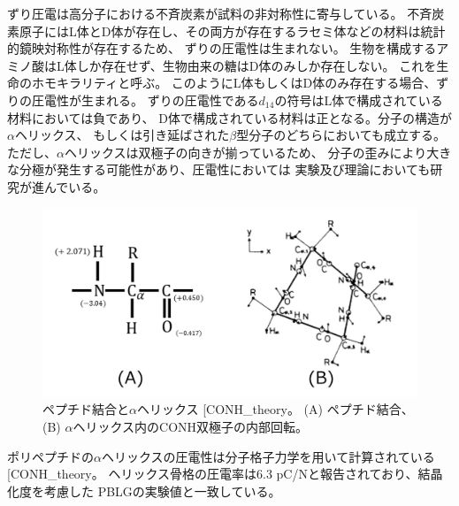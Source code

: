 \documentclass[dvipdfmx,12pt,a4paper]{jreport}
\makeatletter
\DeclareRobustCommand\cite{\unskip
    	\@ifnextchar[{\@tempswatrue\@citex}{\@tempswafalse\@citex[]}}
\makeatother
\begin{document}
			ずり圧電は高分子における不斉炭素が試料の非対称性に寄与している。
			不斉炭素原子にはL体とD体が存在し、その両方が存在するラセミ体などの材料は統計的鏡映対称性が存在するため、
			ずりの圧電性は生まれない。
			生物を構成するアミノ酸はL体しか存在せず、生物由来の糖はD体のみしか存在しない。
			これを生命のホモキラリティと呼ぶ。
			このようにL体もしくはD体のみ存在する場合、ずりの圧電性が生まれる。
			ずりの圧電性である$d_{14}$の符号はL体で構成されている材料においては負であり、
			D体で構成されている材料は正となる。分子の構造が$\alpha$ヘリックス、
			もしくは引き延ばされた$\beta$型分子のどちらにおいても成立する。
			ただし、$\alpha$ヘリックスは双極子の向きが揃っているため、
			分子の歪みにより大きな分極が発生する可能性があり、圧電性においては
			実験及び理論においても研究が進んでいる。
			\begin{figure}[h]
				\centering
				\includegraphics[scale=0.8]{アルファヘリックス_CONH.jpg}
				\caption{ペプチド結合と$\alpha$ヘリックス\cite{CONH_theory}。
				(A) ペプチド結合、(B) $\alpha$ヘリックス内のCONH双極子の内部回転。}
				\label{アルファヘリックス}
			\end{figure}
			ポリペプチドの$\alpha$ヘリックスの圧電性は分子格子力学を用いて計算されている\cite{CONH_theory}。
			ヘリックス骨格の圧電率は$6.3$ pC/Nと報告されており、結晶化度を考慮した
			PBLGの実験値と一致している。
\end{document}

